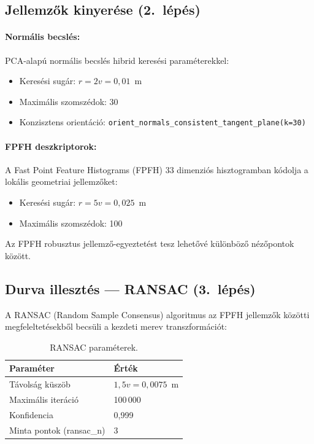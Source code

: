 \documentclass[12pt,a4paper]{article}
\begin{document}
\subsection{Jellemzők kinyerése (2.~lépés)}

\paragraph{Normális becslés:}
PCA-alapú normális becslés hibrid keresési paraméterekkel:
\begin{itemize}[nosep]
    \item Keresési sugár: $r = 2v = 0{,}01$~m
    \item Maximális szomszédok: 30
    \item Konzisztens orientáció: \texttt{orient\_normals\_consistent\_tangent\_plane(k=30)}
\end{itemize}

\paragraph{FPFH deszkriptorok:}
A Fast Point Feature Histograms (FPFH) \cite{rusu2009} 33 dimenziós hisztogramban kódolja a lokális geometriai jellemzőket:
\begin{itemize}[nosep]
    \item Keresési sugár: $r = 5v = 0{,}025$~m
    \item Maximális szomszédok: 100
\end{itemize}

Az FPFH robusztus jellemző-egyeztetést tesz lehetővé különböző nézőpontok között.

\subsection{Durva illesztés — RANSAC (3.~lépés)}

A RANSAC (Random Sample Consensus) \cite{zhou2016} algoritmus az FPFH jellemzők közötti megfeleltetésekből becsüli a kezdeti merev transzformációt:

\begin{table}[H]
\centering
\begin{tabular}{ll}
\toprule
\textbf{Paraméter} & \textbf{Érték} \\
\midrule
Távolság küszöb & $1{,}5v = 0{,}0075$~m \\
Maximális iteráció & 100\,000 \\
Konfidencia & 0,999 \\
Minta pontok (ransac\_n) & 3 \\
\bottomrule
\end{tabular}
\caption{RANSAC paraméterek.}
\end{table}
\end{document}
